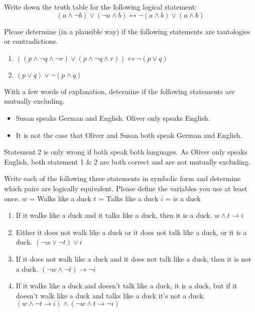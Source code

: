 \documentclass{exercise}
\begin{document}
   Write down the truth table for the following logical statement:
    $$(a \wedge \neg b) \vee (\neg a \wedge b) \leftrightarrow \neg (a \wedge b) \vee (a \wedge b)$$
    \newline
    

   Please determine (in a plausible way) if the following statements are tautologies or contradictions.
    \begin{enumerate}
      \item $((p \wedge \neg q \wedge \neg r) \vee (p \wedge \neg q \wedge r)) \leftrightarrow \neg(p \vee q)$
      \newline
      

      \item $(p \vee q) \vee \neg(p \wedge q)$

    \end{enumerate}

   With a few words of explanation, determine if the following statements are mutually excluding.
    \begin{itemize}
      \item Susan speaks German and English. Oliver only speaks English.
      \item It is not the case that Oliver and Susan both speak German and English.
    \end{itemize}
    \newline
    Statement 2 is only wrong if both speak both languages. As Oliver only speaks English, both statement 1 & 2 are both correct and are not mutually excluding.
    
   Write each of the following three statements in symbolic form and determine which pairs are logically equivalent. Please define the variables you use at least once. \newline
    $w$ = Walks like a duck \newline
    $t$ = Talks like a duck \newline
    $i$ = is a duck
    \begin{enumerate}
      \item If it walks like a duck and it talks like a duck, then it is a duck.
    \newline
    $w \wedge t \rightarrow i$
      \item Either it does not walk like a duck or it does not talk like a duck, or it is a duck. \newline
    $(\neg w \vee \neg t) \vee i$
      \item If it does not walk like a duck and it does not talk like a duck, then it is not a duck. \newline
      $(\neg w \wedge \neg t) \rightarrow \neg i$
      \item If it walks like a duck and doesn't talk like a duck, it is a duck, but if it doesn't walk like a duck and talks like a duck it's not a duck. \newline
      $(w \wedge \neg t \rightarrow i) \wedge (\neg w \wedge t \rightarrow \neg i)$

    \end{enumerate}
    
\end{document}
